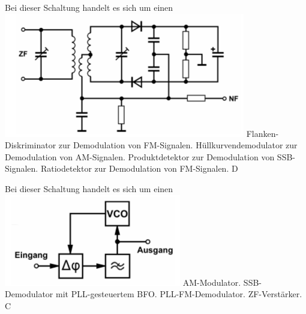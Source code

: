{Bei dieser Schaltung handelt es sich um einen \\ \includegraphics[scale=0.5]{Modulation/Bilder/TD508.png}}%
{Flanken-Diskriminator zur Demodulation von FM-Signalen.}%
{Hüllkurvendemodulator zur Demodulation von AM-Signalen.}%
{Produktdetektor zur Demodulation von SSB-Signalen.}%
{Ratiodetektor zur Demodulation von FM-Signalen.}%
{D}%

{Bei dieser Schaltung handelt es sich um einen \\ \includegraphics[scale=0.5]{Modulation/Bilder/TD509.png}}%
{AM-Modulator.}%
{SSB-Demodulator mit PLL-gesteuertem BFO.}%
{PLL-FM-Demodulator.}%
{ZF-Verstärker.}%
{C}%
